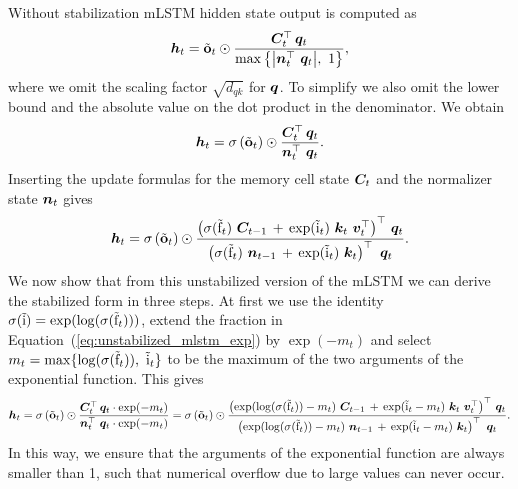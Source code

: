 \documentclass{article}
\begin{document}
    Without stabilization mLSTM hidden state output is computed as
    \begin{equation}
        \bm{h}_t = \tilde{\mathbf{o}}_t \odot \frac{\bm{C}_t^\top \, \bm{q}_t}{\max \left\{ {{\left| \bm{n}_t^\top \ \bm{q}_t \right|}}, \ 1 \right\}},
    \end{equation}
    where we omit the scaling factor $\sqrt{d_{qk}}$ for $\bm{q}$.
    To simplify we also omit the lower bound and the absolute value on the dot product in the denominator.
    We obtain
    \begin{equation}
        \bm{h}_t =  \sigma \left( \tilde{\mathbf{o}}_t \right) \odot \frac{ \bm{C}_t^\top \, \bm{q}_t}{\bm{n}_t^\top \ \bm{q}_t}.
    \end{equation}
    Inserting the update formulas for the memory cell state $\bm{C}_t$ and the normalizer state $\bm{n}_t$ gives
    \begin{equation}
        \label{eq:unstabilized_mlstm_exp}
        \Bh_t =  \sigma \left( \tilde{\bfo}_t \right) \odot \frac{\left( \sigma(\tilde{\Rf}_t) \ \BC_{t-1} \, + \, \exp(\tilde{\Ri}_t) \ {\Bk_t \ \Bv_t^\top} \right)^\top \, \Bq_t}{\left( \sigma(\tilde{\Rf}_t) \ \Bn_{t-1} \, + \, \exp(\tilde{\Ri}_t) \ \Bk_t \right)^\top \ \Bq_t}.
    \end{equation}
    We now show that from this unstabilized version of the mLSTM we can derive the stabilized form in three steps.
    At first we use the identity $\sigma(\tilde{\mathrm{i}}) = \exp ( \log ( \sigma (\tilde{\mathrm{f}}_t) ) )$,
    extend the fraction in Equation~(\ref{eq:unstabilized_mlstm_exp}) by $\exp(-m_t)$ and select $m_t = \max \{\log(\sigma(\tilde{\mathrm{f}}_t)), \ \tilde{\mathrm{i}}_t \}$ to be the maximum of the two arguments of the exponential function.
    This gives
    \begin{equation}
        \begin{aligned}
            \bm{h}_t =  \sigma \left( \tilde{\mathbf{o}}_t \right) \odot \frac{ \bm{C}_t^\top \, \bm{q}_t \cdot \exp(-m_t)}{\bm{n}_t^\top \ \bm{q}_t \cdot \exp(-m_t)}
            =  \sigma \left( \tilde{\mathbf{o}}_t \right) \odot \frac{\left( \exp( \log(\sigma(\tilde{\mathrm{f}}_t)) - m_t) \ \bm{C}_{t-1} \, + \, \exp(\tilde{\mathrm{i}}_t - m_t) \ {\bm{k}_t \ \bm{v}_t^\top} \right)^\top \, \bm{q}_t}{\left( \exp( \log(\sigma(\tilde{\mathrm{f}}_t)) - m_t) \ \bm{n}_{t-1} \, + \, \exp(\tilde{\mathrm{i}}_t - m_t) \ \bm{k}_t \right)^\top \ \bm{q}_t}.
        \end{aligned}
    \end{equation}
    In this way, we ensure that the arguments of the exponential function are always smaller than 1, such that numerical overflow due to large values can never occur.
\end{document}
